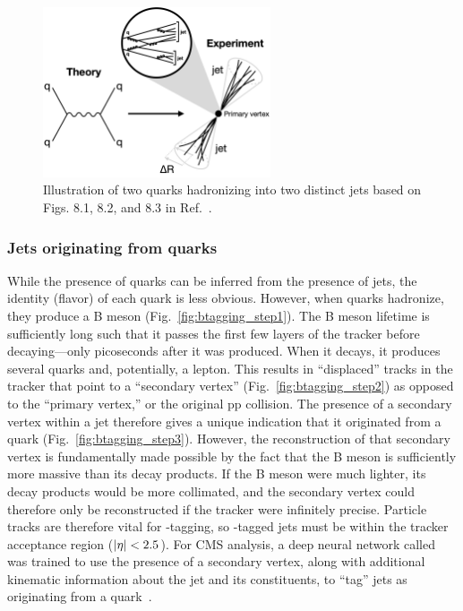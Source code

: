 \begin{figure}[htb]
    \centering
    \includegraphics[width=0.6\textwidth]{fig/hadronization.png}
    \caption[Illustration of two quarks hadronizing into two distinct jets.]{
        Illustration of two quarks hadronizing into two distinct jets based on Figs. 8.1, 8.2, and 8.3 in Ref.~\cite{GriffithsParticle}.
    }
    \label{fig:hadronization}
\end{figure}

\subsubsection{Jets originating from \Pb quarks}
While the presence of quarks can be inferred from the presence of jets, the identity (flavor) of each quark is less obvious. 
However, when \Pb quarks hadronize, they produce a B meson (Fig.~\ref{fig:btagging_step1}). 
The B meson lifetime is sufficiently long such that it passes the first few layers of the tracker before decaying---only picoseconds after it was produced. 
When it decays, it produces several quarks and, potentially, a lepton. 
This results in ``displaced'' tracks in the tracker that point to a ``secondary vertex'' (Fig.~\ref{fig:btagging_step2}) as opposed to the ``primary vertex,'' or the original pp collision. 
The presence of a secondary vertex within a jet therefore gives a unique indication that it originated from a \Pb quark (Fig.~\ref{fig:btagging_step3}). 
However, the reconstruction of that secondary vertex is fundamentally made possible by the fact that the B meson is sufficiently more massive than its decay products. 
If the B meson were much lighter, its decay products would be more collimated, and the secondary vertex could therefore only be reconstructed if the tracker were infinitely precise. 
Particle tracks are therefore vital for \Pb-tagging, so \Pb-tagged jets must be within the tracker acceptance region ($\lvert \eta \rvert < 2.5$). 
For CMS analysis, a deep neural network called \DeepJet was trained to use the presence of a secondary vertex, along with additional kinematic information about the jet and its constituents, to ``tag'' jets as originating from a \Pb quark~\cite{Bols:2020bkb}. 

